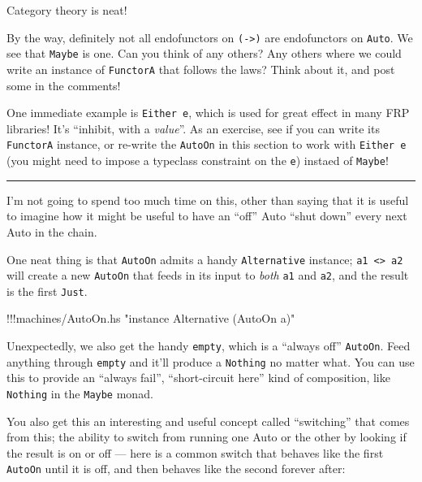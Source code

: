 \documentclass[]{article}
\newenvironment{Shaded}{}{}
\newcommand{\StringTok}[1]{\textcolor[rgb]{0.25,0.44,0.63}{{#1}}}
\newcommand{\FunctionTok}[1]{\textcolor[rgb]{0.02,0.16,0.49}{{#1}}}
\newcommand{\NormalTok}[1]{{#1}}
\begin{document}
Category theory is neat!

By the way, definitely not all endofunctors on
\texttt{(-\textgreater{})} are endofunctors on \texttt{Auto}. We see
that \texttt{Maybe} is one. Can you think of any others? Any others
where we could write an instance of \texttt{FunctorA} that follows the
laws? Think about it, and post some in the comments!

One immediate example is \texttt{Either\ e}, which is used for great
effect in many FRP libraries! It's ``inhibit, with a \emph{value}''. As
an exercise, see if you can write its \texttt{FunctorA} instance, or
re-write the \texttt{AutoOn} in this section to work with
\texttt{Either\ e} (you might need to impose a typeclass constraint on
the \texttt{e}) instaed of \texttt{Maybe}!

\begin{center}\rule{0.5\linewidth}{\linethickness}\end{center}

I'm not going to spend too much time on this, other than saying that it
is useful to imagine how it might be useful to have an ``off'' Auto
``shut down'' every next Auto in the chain.

One neat thing is that \texttt{AutoOn} admits a handy
\texttt{Alternative} instance;
\texttt{a1\ \textless{}\textbar{}\textgreater{}\ a2} will create a new
\texttt{AutoOn} that feeds in its input to \emph{both} \texttt{a1} and
\texttt{a2}, and the result is the first \texttt{Just}.

\begin{Shaded}
\begin{Highlighting}[]
\FunctionTok{!!!}\NormalTok{machines}\FunctionTok{/}\NormalTok{AutoOn.hs }\StringTok{"instance Alternative (AutoOn a)"}
\end{Highlighting}
\end{Shaded}

Unexpectedly, we also get the handy \texttt{empty}, which is a ``always
off'' \texttt{AutoOn}. Feed anything through \texttt{empty} and it'll
produce a \texttt{Nothing} no matter what. You can use this to provide
an ``always fail'', ``short-circuit here'' kind of composition, like
\texttt{Nothing} in the \texttt{Maybe} monad.

You also get this an interesting and useful concept called ``switching''
that comes from this; the ability to switch from running one Auto or the
other by looking if the result is on or off --- here is a common switch
that behaves like the first \texttt{AutoOn} until it is off, and then
behaves like the second forever after:
\end{document}
